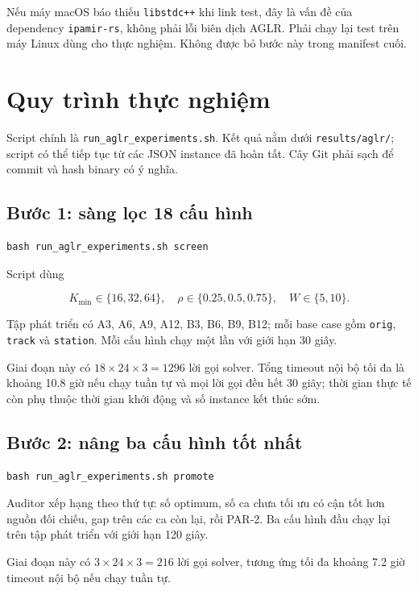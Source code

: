 \documentclass[11pt,a4paper]{article}
\newcommand{\code}[1]{\texttt{#1}}
\newcommand{\file}[1]{\nolinkurl{#1}}
\begin{document}
Nếu máy macOS báo thiếu \code{libstdc++} khi link test, đây là vấn đề của
dependency \code{ipamir-rs}, không phải lỗi biên dịch AGLR. Phải chạy lại test
trên máy Linux dùng cho thực nghiệm. Không được bỏ bước này trong manifest cuối.

\section{Quy trình thực nghiệm}

Script chính là \file{run_aglr_experiments.sh}. Kết quả nằm dưới
\file{results/aglr/}; script có thể tiếp tục từ các JSON instance đã hoàn tất.
Cây Git phải sạch để commit và hash binary có ý nghĩa.

\subsection{Bước 1: sàng lọc 18 cấu hình}

\begin{verbatim}
bash run_aglr_experiments.sh screen
\end{verbatim}

Script dùng

\[
K_{\min}\in\{16,32,64\},\quad
\rho\in\{0.25,0.5,0.75\},\quad
W\in\{5,10\}.
\]

Tập phát triển có A3, A6, A9, A12, B3, B6, B9, B12; mỗi base case gồm
\code{orig}, \code{track} và \code{station}. Mỗi cấu hình chạy một lần với giới
hạn 30 giây.

Giai đoạn này có $18\times24\times3=1296$ lời gọi solver. Tổng timeout nội bộ
tối đa là khoảng 10.8 giờ nếu chạy tuần tự và mọi lời gọi đều hết 30 giây; thời
gian thực tế còn phụ thuộc thời gian khởi động và số instance kết thúc sớm.

\subsection{Bước 2: nâng ba cấu hình tốt nhất}

\begin{verbatim}
bash run_aglr_experiments.sh promote
\end{verbatim}

Auditor xếp hạng theo thứ tự: số optimum, số ca chưa tối ưu có cận tốt
hơn nguồn đối chiếu, gap trên các ca còn lại, rồi PAR-2. Ba cấu
hình đầu chạy lại trên tập phát triển với giới hạn 120 giây.

Giai đoạn này có $3\times24\times3=216$ lời gọi solver, tương ứng tối đa khoảng
7.2 giờ timeout nội bộ nếu chạy tuần tự.
\end{document}
